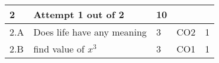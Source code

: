 \documentclass[12pt]{article}
\begin{document}
	
	


	
	
		

	
	
	\begin{longtable}{|L{1cm}|L{8cm}|C{1cm}|C{1cm}|C{1cm}|}\hline
			\bf2 & \bf{Attempt} \bf1 out of \bf2 & \bf10 & & \\ \hline
				2.A &
	Does life have any meaning \newline
		 &  3 & CO2 & 1\\ \hline
		2.B &
	find value of $x^{3}$ \newline
		 &  3 & CO1 & 1\\ \hline
		\end{longtable}

	
	


	
	
		
	
\end{document}
